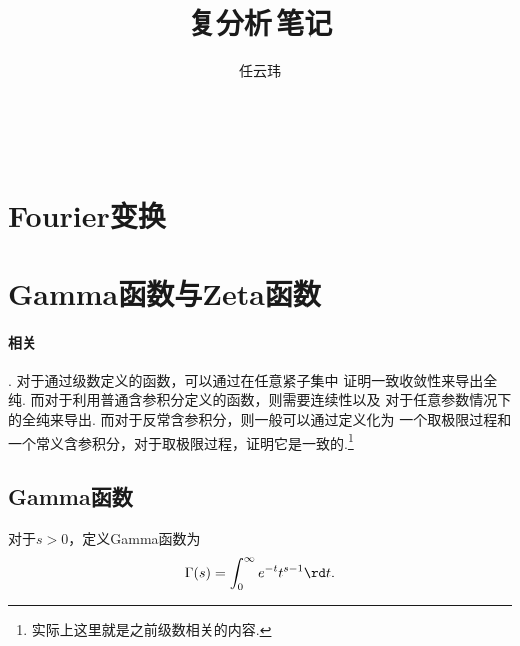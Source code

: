 

\title{复分析$\,$笔记}
\author{任云玮}
\date{}



\maketitle
\tableofcontents

\newpage

 
\newpage


\newpage


\newpage
\section{Fourier变换}

\newpage



\newpage
\section{Gamma函数与Zeta函数}

  \paragraph{相关}
    . 对于通过级数定义的函数，可以通过在任意紧子集中
    证明一致收敛性来导出全纯. 而对于利用普通含参积分定义的函数，则需要连续性以及
    对于任意参数情况下的全纯来导出. 而对于反常含参积分，则一般可以通过定义化为
    一个取极限过程和一个常义含参积分，对于取极限过程，证明它是一致的.\footnote{
      实际上这里就是之前级数相关的内容.
    }

\subsection{Gamma函数}

  \begin{defi}[Gamma函数]
    对于$s>0$，定义Gamma函数为
    \begin{equation}
      \label{equ: Gamma函数}
      \Gamma(s) = \int_0^\infty e^{-t}t^{s-1}\rd t.
    \end{equation}
  \end{defi}

